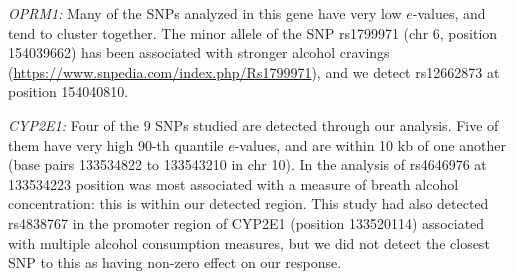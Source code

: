 {\it OPRM1:} Many of the SNPs analyzed in this gene have very low $e$-values, and tend to cluster together. The minor allele of the SNP rs1799971 (chr 6, position 154039662) has been associated with stronger alcohol cravings (\url{https://www.snpedia.com/index.php/Rs1799971}), and we detect rs12662873 at position 154040810.

{\it CYP2E1:} Four of the 9 SNPs studied are detected through our analysis. Five of them have very high 90-th quantile $e$-values, and are within 10 kb of one another (base pairs 133534822 to 133543210 in chr 10). In the analysis of \cite{LindEtal12} rs4646976 at 133534223 position was most associated with a measure of breath alcohol concentration: this is within our detected region. This study had also detected rs4838767 in the promoter region of CYP2E1 (position 133520114) associated with multiple alcohol consumption measures, but we did not detect the closest SNP to this as having non-zero effect on our response.

